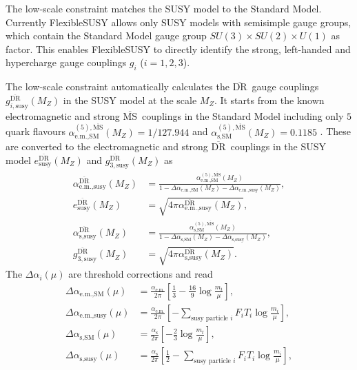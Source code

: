 \documentclass[final,3p,11pt,pdflatex]{elsarticle}
\makeatletter
\newcommand{\fs}{FlexibleSUSY\@\xspace}
\newcommand{\textoverline}[1]{$\overline{\mbox{#1}}$}
\newcommand{\DRbar}{\textoverline{DR}\xspace}
\newcommand{\MSbar}{\textoverline{MS}\xspace}
\makeatother
\begin{document}
The low-scale constraint matches the SUSY model to the Standard Model.
Currently \fs allows only SUSY models with semisimple gauge groups,
which contain the Standard Model gauge group $SU(3)\times SU(2)\times
U(1)$ as factor.  This enables \fs to directly identify the strong,
left-handed and hypercharge gauge couplings $g_i$ ($i=1,2,3$).

The low-scale constraint automatically calculates the \DRbar\ gauge
couplings $g_{i,\text{susy}}^{\text{\DRbar}}(M_Z)$ in the SUSY model
at the scale $M_Z$.  It starts from the known electromagnetic and
strong \MSbar\ couplings in the Standard Model including only $5$
quark flavours
$\alpha_{\text{e.m.},\text{SM}}^{(5),\text{\MSbar}}(M_Z) = 1/127.944$
and $\alpha_{\text{s},\text{SM}}^{(5),\text{\MSbar}}(M_Z) = 0.1185$
\cite{Beringer:1900zz}.  These are converted to the electromagnetic
and strong \DRbar\ couplings in the SUSY model
$e_{\text{susy}}^{\text{\DRbar}}(M_Z)$ and
$g_{3,\text{susy}}^{\text{\DRbar}}(M_Z)$ as
%
\begin{align}
  \alpha_{\text{e.m.},\text{susy}}^{\text{\DRbar}}(M_Z) &=
  \frac{\alpha_{\text{e.m.},\text{SM}}^{(5),\text{\MSbar}}(M_Z)}{1 -
    \Delta\alpha_{\text{e.m.},\text{SM}}(M_Z) -
    \Delta\alpha_{\text{e.m.},\text{susy}}(M_Z)} ,\\
    e_{\text{susy}}^{\text{\DRbar}}(M_Z) &=
    \sqrt{4\pi\alpha_{\text{e.m.},\text{susy}}^{\text{\DRbar}}(M_Z)}, \\
  \alpha_{\text{s},\text{susy}}^{\text{\DRbar}}(M_Z) &=
  \frac{\alpha_{\text{s},\text{SM}}^{(5),\text{\MSbar}}(M_Z)}{1 -
    \Delta\alpha_{\text{s},\text{SM}}(M_Z)
    - \Delta\alpha_{\text{s},\text{susy}}(M_Z)} ,\\
  g_{3,\text{susy}}^{\text{\DRbar}}(M_Z) &=
  \sqrt{4\pi\alpha_{\text{s},\text{susy}}^{\text{\DRbar}}(M_Z)} .
\end{align}
%
The $\Delta\alpha_i(\mu)$ are threshold corrections and read
%
\begin{align}
  \Delta\alpha_{\text{e.m.},\text{SM}}(\mu) &=
  \frac{\alpha_\text{e.m.}}{2\pi} \left[\frac{1}{3}
    - \frac{16}{9} \log{\frac{m_t}{\mu}} \right],\\
  \Delta\alpha_{\text{e.m.},\text{susy}}(\mu) &=
  \frac{\alpha_\text{e.m.}}{2\pi} \left[ -\sum_{\text{susy particle }
      i}
    F_i T_i \log{\frac{m_i}{\mu}} \right],\\
  \Delta\alpha_{\text{s},\text{SM}}(\mu) &=
  \frac{\alpha_\text{s}}{2\pi} \left[
    -\frac{2}{3} \log{\frac{m_t}{\mu}} \right],\\
  \Delta\alpha_{\text{s},\text{susy}}(\mu) &=
  \frac{\alpha_\text{s}}{2\pi}\left[ \frac{1}{2}-\sum_{\text{susy
        particle } i} F_i T_i \log{\frac{m_i}{\mu}} \right] ,
\end{align}
\end{document}
